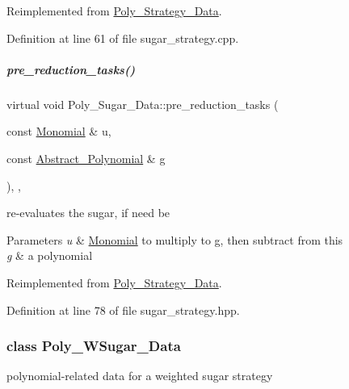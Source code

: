 Reimplemented from \hyperlink{group__strategygroup_a0d71db50c58a24f48f94eae6a48c2149}{Poly\+\_\+\+Strategy\+\_\+\+Data}.



Definition at line 61 of file sugar\+\_\+strategy.\+cpp.

\mbox{\label{group__strategygroup_a845d9c0d53954a50fe3112e94b1cdfa8}} 
\subparagraph{\texorpdfstring{pre\+\_\+reduction\+\_\+tasks()}{pre\_reduction\_tasks()}\hspace{0.1cm}{\footnotesize\ttfamily [2/2]}}
{\footnotesize\ttfamily virtual void Poly\+\_\+\+Sugar\+\_\+\+Data\+::pre\+\_\+reduction\+\_\+tasks (\begin{DoxyParamCaption}\item[{const \hyperlink{group__polygroup_class_monomial}{Monomial} \&}]{u,  }\item[{const \hyperlink{group__polygroup_class_abstract___polynomial}{Abstract\+\_\+\+Polynomial} \&}]{g }\end{DoxyParamCaption})\hspace{0.3cm}{\ttfamily [inline]}, {\ttfamily [override]}, {\ttfamily [virtual]}}



re-\/evaluates the sugar, if need be 


\begin{DoxyParams}{Parameters}
{\em u} & \hyperlink{group__polygroup_class_monomial}{Monomial} to multiply to {\ttfamily g}, then subtract from {\ttfamily this} \\
\hline
{\em g} & a polynomial \\
\hline
\end{DoxyParams}


Reimplemented from \hyperlink{group__strategygroup_a077b9fb020596f92ed0cb38fea2a0b71}{Poly\+\_\+\+Strategy\+\_\+\+Data}.



Definition at line 78 of file sugar\+\_\+strategy.\+hpp.

\label{class_poly___w_sugar___data}
\subsubsection{class Poly\+\_\+\+W\+Sugar\+\_\+\+Data}
polynomial-\/related data for a weighted sugar strategy 

